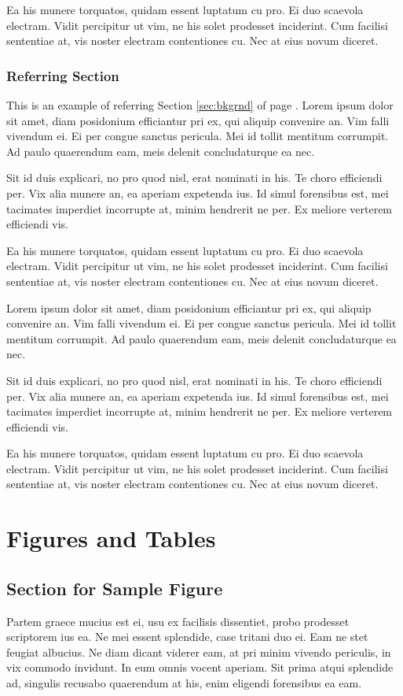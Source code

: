 Ea his munere torquatos, quidam essent luptatum cu pro. Ei duo scaevola electram. Vidit percipitur ut vim, ne his solet prodesset inciderint. Cum facilisi sententiae at, vis noster electram contentiones cu. Nec at eius novum diceret.
\subsection{Referring Section}
This is an example of referring Section \ref{sec:bkgrnd} of page \pageref{sec:bkgrnd}. Lorem ipsum dolor sit  amet, diam posidonium efficiantur pri ex, qui aliquip convenire an. Vim falli vivendum ei. Ei per congue sanctus pericula. Mei id tollit mentitum corrumpit. Ad paulo quaerendum eam, meis delenit concludaturque ea nec.\par
Sit id duis explicari, no pro quod nisl, erat nominati in his. Te choro efficiendi per. Vix alia munere an, ea aperiam expetenda ius. Id simul forensibus est, mei tacimates imperdiet incorrupte at, minim hendrerit ne per. Ex meliore verterem efficiendi vis.

Ea his munere torquatos, quidam essent luptatum cu pro. Ei duo scaevola electram. Vidit percipitur ut vim, ne his solet prodesset inciderint. Cum facilisi sententiae at, vis noster electram contentiones cu. Nec at eius novum diceret.

Lorem ipsum dolor sit  amet, diam posidonium efficiantur pri ex, qui aliquip convenire an. Vim falli vivendum ei. Ei per congue sanctus pericula. Mei id tollit mentitum corrumpit. Ad paulo quaerendum eam, meis delenit concludaturque ea nec.\par
Sit id duis explicari, no pro quod nisl, erat nominati in his. Te choro efficiendi per. Vix alia munere an, ea aperiam expetenda ius. Id simul forensibus est, mei tacimates imperdiet incorrupte at, minim hendrerit ne per. Ex meliore verterem efficiendi vis.

Ea his munere torquatos, quidam essent luptatum cu pro. Ei duo scaevola electram. Vidit percipitur ut vim, ne his solet prodesset inciderint. Cum facilisi sententiae at, vis noster electram contentiones cu. Nec at eius novum diceret.
\chapter{Figures and Tables}
\section{Section for Sample Figure}
Partem graece mucius est ei, usu ex facilisis dissentiet, probo prodesset scriptorem ius ea. Ne mei essent splendide, case tritani duo ei. Eam ne stet feugiat albucius. Ne diam dicant viderer eam, at pri minim vivendo periculis, in vix commodo invidunt. In eum omnis vocent aperiam. Sit prima atqui splendide ad, singulis recusabo quaerendum at his, enim eligendi forensibus ea eam.


